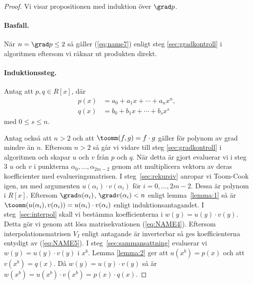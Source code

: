 \begin{proof}
Vi visar propositionen med induktion över $\grad p$.

\paragraph{Basfall.}
När $n = \grad p \leq 2$ så gäller (\ref{eq:name7}) enligt steg
\ref{sec:gradkontroll} i algoritmen eftersom vi räknar ut produkten direkt.

\paragraph{Induktionssteg.}
\label{sec:induktion}
Antag att $p, q \in R[x]$, där
\begin{align*}
  p(x) &= a_0 + a_1 x + \cdots + a_n x^n, \\
  q(x) &= b_0 + b_1 x + \cdots + b_s x^s
\end{align*}
med $0 \leq s \leq n$.

\bigskip\noindent
Antag också att $n > 2$ och att $\toomm (f, g) = f \cdot g$ gäller för polynom
av grad mindre än $n$. Eftersom $n > 2$ så går vi vidare till steg
\ref{sec:gradkontroll} i algoritmen och skapar $u$ och $v$ från $p$ och $q$. När
detta är gjort evaluerar vi i steg 3 $u$ och $v$ i punkterna $\alpha_0, \dots,
\alpha_{2m-2}$ genom att multiplicera vektorn av deras koefficienter med
evalueringsmatrisen. I steg~\ref{sec:rekursiv} anropar vi Toom-Cook igen, nu med
argumenten $u(\alpha_i) \cdot v(\alpha_i)$ för $i = 0, \ldots , 2m-2$. Dessa är
polynom i $R[x]$. Eftersom $\grad u(\alpha_i)$, $\grad v(\alpha_i) < n$ enligt
lemma~\ref{lemma:1} så är $\toomm (u(\alpha_i), v(\alpha_i)) = u(\alpha_i) \cdot
v(\alpha_i)$ enligt induktionsantagandet. I steg~\ref{sec:interpol} skall vi
bestämma koefficienterna i $w(y)=u(y) \cdot v(y)$. Detta gör vi genom att lösa
matrisekvationen (\ref{eq:NAME4}). Eftersom interpolationsmatrisen $V_I$ enligt
antagande är inverterbar så ges koefficienterna entydigt av (\ref{eq:NAME5}). I
steg~\ref{sec:sammansattning} evaluerar vi $w(y)=u(y) \cdot v(y)$ i $x^b$. Lemma
\ref{lemma:2} ger att $u(x^b)=p(x)$ och att $v(x^b)=q(x)$. Då $w(y)=u(y) \cdot
v(y)$ så är $w(x^b)=u(x^b) \cdot v(x^b)=p(x) \cdot q(x)$.
\end{proof}

